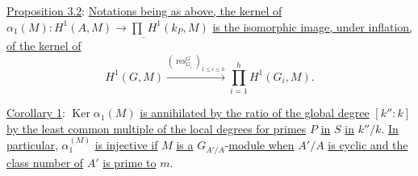 \uline{Proposition  3.2}: \uline{Notations being as above, the kernel of} $\alpha_1(M):H^1(A,M)\longrightarrow\underline{\prod}H^1(k_P,M)$ \uline{is the isomorphic image, under inflation, of the kernel of}
\[
H^1(G,M)\xrightarrow{(\operatorname{res}_{G_i}^{G})_{1\leq i\leq h}}\prod_{i=1}^{h}H^1(G_i,M).
\]

\uline{Corollary 1}: $\operatorname{Ker}\alpha_1(M)$ \uline{is annihilated by the ratio of the global degree} $[k'':k]$ \uline{by the least common multiple of the local degrees for primes} $P$ \uline{in} $S$ \uline{in} $k''/k$. \uline{In particular}, $\alpha_1^{(M)}$ \uline{is injective if} $M$ \uline{is a} $G_{A'/A}$-\uline{module when} $A'/A$ \uline{is cyclic and the class number of} $A'$ \uline{is prime to} $m$.

